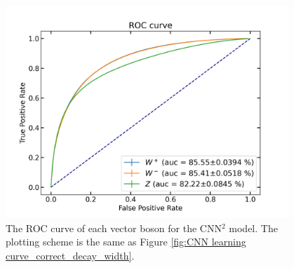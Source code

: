\documentclass[12pt]{article}
\begin{document}
		\begin{figure}[htpb]
			\centering
			\includegraphics[width=0.95\textwidth]{CNNsq_roc_auc_correct_width.png}
			\caption{The ROC curve of each vector boson for the CNN$^2$ model. The plotting scheme is the same as Figure \ref{fig:CNN learning curve_correct_decay_width}.}
			\label{fig:CNNsq roc curve_correct_decay_width}
		\end{figure}
\end{document}
